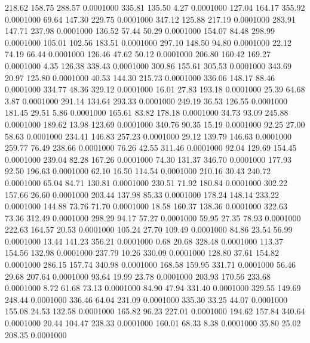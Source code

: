  218.62  158.75  288.57   0.0001000
 335.81  135.50    4.27   0.0001000
 127.04  164.17  355.92   0.0001000
  69.64  147.30  229.75   0.0001000
 347.12  125.88  217.19   0.0001000
 283.91  147.71  237.98   0.0001000
 136.52   57.44   50.29   0.0001000
 154.07   84.48  298.99   0.0001000
 105.01  102.56  183.51   0.0001000
 297.10  148.50   94.80   0.0001000
  22.12   74.19   66.44   0.0001000
 126.46   47.62   50.12   0.0001000
 206.80  160.42  169.27   0.0001000
   4.35  126.38  338.43   0.0001000
 300.86  155.61  305.53   0.0001000
 343.69   20.97  125.80   0.0001000
  40.53  144.30  215.73   0.0001000
 336.06  148.17   88.46   0.0001000
 334.77   48.36  329.12   0.0001000
  16.01   27.83  193.18   0.0001000
  25.39   64.68    3.87   0.0001000
 291.14  134.64  293.33   0.0001000
 249.19   36.53  126.55   0.0001000
 181.45   29.51    5.86   0.0001000
 165.61   83.82  178.18   0.0001000
  34.73   93.09  245.88   0.0001000
 189.62   13.98  123.69   0.0001000
 340.76   90.35   15.19   0.0001000
  92.25   27.00   58.63   0.0001000
 234.41  146.83  257.23   0.0001000
  29.12  139.79  146.63   0.0001000
 259.77   76.49  238.66   0.0001000
  76.26   42.55  311.46   0.0001000
  92.04  129.69  154.45   0.0001000
 239.04   82.28  167.26   0.0001000
  74.30  131.37  346.70   0.0001000
 177.93   92.50  196.63   0.0001000
  62.10   16.50  114.54   0.0001000
 210.16   30.43  240.72   0.0001000
  65.04   84.71  130.81   0.0001000
 230.51   71.92  180.84   0.0001000
 302.22  157.66   26.60   0.0001000
 203.44  137.98   85.33   0.0001000
 178.24  148.14  233.22   0.0001000
 144.88   73.76   71.70   0.0001000
  18.58  160.37  138.36   0.0001000
 322.63   73.36  312.49   0.0001000
 298.29   94.17   57.27   0.0001000
  59.95   27.35   78.93   0.0001000
 222.63  164.57   20.53   0.0001000
 105.24   27.70  109.49   0.0001000
  84.86   23.54   56.99   0.0001000
  13.44  141.23  356.21   0.0001000
   0.68   20.68  328.48   0.0001000
 113.37  154.56  132.98   0.0001000
 237.79   10.26  330.09   0.0001000
 128.80   37.61  154.82   0.0001000
 286.15  157.74  340.98   0.0001000
 168.58  159.95  331.71   0.0001000
  56.46   29.68  207.64   0.0001000
  93.64   19.99   23.78   0.0001000
 203.93  170.56  233.68   0.0001000
   8.72   61.68   73.13   0.0001000
  84.90   47.94  331.40   0.0001000
 329.55  149.69  248.44   0.0001000
 336.46   64.04  231.09   0.0001000
 335.30   33.25   44.07   0.0001000
 155.08   24.53  132.58   0.0001000
 165.82   96.23  227.01   0.0001000
 194.62  157.84  340.64   0.0001000
  20.44  104.47  238.33   0.0001000
 160.01   68.33    8.38   0.0001000
  35.80   25.02  208.35   0.0001000
